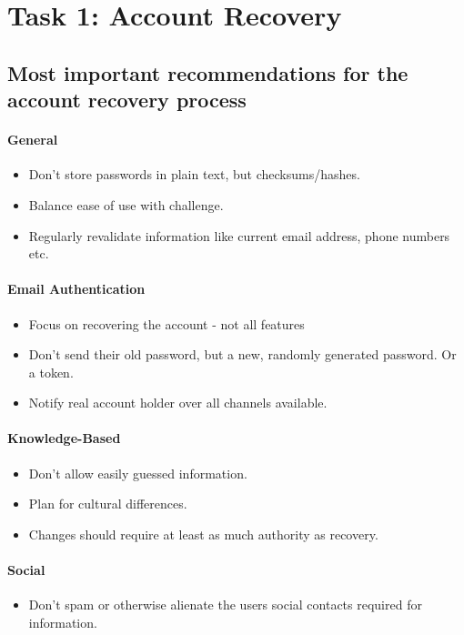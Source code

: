 \section{Task 1: Account Recovery}

\subsection{Most important recommendations for the account recovery process}

\paragraph{General}
\begin{itemize}
	\item Don't store passwords in plain text, but checksums/hashes.
	\item Balance ease of use with challenge.
	\item Regularly revalidate information like current email address, phone numbers etc.
\end{itemize}

\paragraph{Email Authentication}
\begin{itemize}
	\item Focus on recovering the account - not all features
	\item Don't send their old password, but a new, randomly generated password. Or a token.
	\item Notify real account holder over all channels available.
\end{itemize}

\paragraph{Knowledge-Based}
\begin{itemize}
	\item Don't allow easily guessed information.
	\item Plan for cultural differences.
	\item Changes should require at least as much authority as recovery.
\end{itemize}

\paragraph{Social}
\begin{itemize}
	\item Don't spam or otherwise alienate the users social contacts required for information.
\end{itemize}


